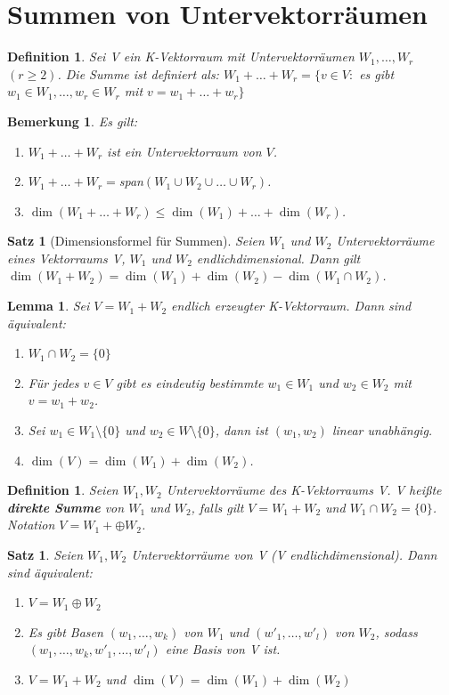 \documentclass[12pt,a4paper]{article}
\theoremstyle{plain}
\newtheorem{Satz}[Theorem]{Satz}
\newtheorem{Lemma}[Theorem]{Lemma}
\newtheorem{Definition}[Theorem]{Definition}
\newtheorem{Bemerkung}[Theorem]{Bemerkung}
\newcommand{\herv}[1]{{\emph{\textbf{#1}}}}
\numberwithin{equation}{section}
\begin{document}
\section{Summen von Untervektorräumen}
\begin{Definition}
Sei V ein K-Vektorraum mit Untervektorräumen $W_1,\ldots,W_r$ $(r\geq 2)$. Die Summe ist definiert als: $W_1+\ldots+W_r=\{v\in V:$ es gibt $w_1\in W_1,\ldots, w_r\in W_r$ mit $v=w_1+\ldots+w_r\}$
\end{Definition}
\begin{Bemerkung}
Es gilt: \begin{enumerate}
\renewcommand{\labelenumi}{\alph{enumi})}
\item $W_1+\ldots+W_r$ ist ein Untervektorraum von $V$.
\item $W_1+\ldots+W_r=$span$(W_1\cup W_2\cup \ldots \cup W_r)$.
\item $\dim(W_1+\ldots+W_r)\leq \dim(W_1)+\ldots+\dim(W_r)$.
\end{enumerate}
\end{Bemerkung}
\begin{Satz}[Dimensionsformel für Summen]
Seien $W_1$ und $W_2$ Untervektorräume eines Vektorraums V, $W_1$ und $W_2$ endlichdimensional. Dann gilt $\dim(W_1+W_2)=\dim(W_1)+\dim(W_2)-\dim(W_1\cap W_2)$.
\end{Satz}
\begin{Lemma}
Sei $V=W_1+W_2$ endlich erzeugter K-Vektorraum. Dann sind äquivalent: \begin{enumerate}
\renewcommand{\labelenumi}{\emph{(\roman{enumi})}}
\item $W_1\cap W_2=\{0\}$
\item Für jedes $v\in V$ gibt es eindeutig bestimmte $w_1\in W_1$ und $w_2\in W_2$ mit $v=w_1+w_2$.
\item Sei $w_1 \in W_1\setminus\{0\}$ und $w_2\in W\setminus\{0\}$, dann ist $(w_1,w_2)$ linear unabhängig.
\item $\dim(V)=\dim(W_1)+\dim(W_2)$.
\end{enumerate}
\end{Lemma}
\begin{Definition}
Seien $W_1, W_2$ Untervektorräume des K-Vektorraums V. V heißte \herv{direkte Summe} von $W_1$ und $W_2$, falls gilt $V=W_1+W_2$ und $W_1\cap W_2=\{0\}$. Notation $V=W_1+\oplus W_2$.
\end{Definition}
\begin{Satz}
Seien $W_1, W_2$ Untervektorräume von V (V endlichdimensional). Dann sind äquivalent:
\begin{enumerate}
\renewcommand{\labelenumi}{\emph{(\roman{enumi})}}
\item $V=W_1\oplus W_2$
\item Es gibt Basen $(w_1,\ldots,w_k)$ von $W_1$ und $(w'_1,\ldots,w'_l)$ von $W_2$, sodass $(w_1,\ldots,w_k,w'_1,\ldots,w'_l)$ eine Basis von V ist.
\item $V=W_1+W_2$ und $\dim(V)=\dim(W_1)+\dim(W_2)$
\end{enumerate}
\end{Satz}
\end{document}
